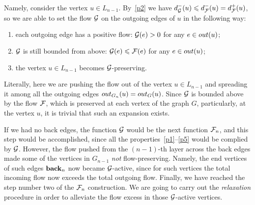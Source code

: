 \documentclass[12pt,oneside,a4paper]{amsart}
\begin{document}
        Namely, consider the vertex $u \in L_{n-1}$.
        By~\ref{p2} we have $d_{\cal{G}}^{-}(u) \leq d_{\flowpos}^{-}(u) = d_{\flowpos}^{+}(u)$,
          so we are able to set the flow $\cal{G}$ on the outgoing edges of $u$ in the following way:
        \begin{enumerate}[label=\textbf{(\roman*)}]
          \item\label{posprop} each outgoing edge has a positive flow: $\cal{G}(e) > 0$ for any $e \in \eout(u)$;
          \item $\cal{G}$ is still bounded from above: $\cal{G}(e) \leq \flowpos(e)$ for any $e \in \eout(u)$;
          \item the vertex $u \in L_{n-1}$ becomes $\cal{G}$-preserving.
        \end{enumerate}
        \begin{remark}
          Literally, here we are pushing the flow out of the vertex $u \in L_{n-1}$ and spreading it among all the outgoing edges
            $\eout_{G_n}(u) = \eout_G(u)$.
          Since $\cal{G}$ is bounded above by the flow $\flowpos$, which is preserved at each vertex of the graph $G$,
            particularly, at the vertex $u$, it is trivial that such an expansion exists.
        \end{remark}
        If we had no back edges, the function $\cal{G}$ would be the next function $\flowposn{n}$, and this step would be accomplished,
          since all the properties~\ref{p1}--\ref{p5} would be complied by $\cal{G}$.
        However, the flow pushed from the $(n-1)$-th layer across the back edges made some of the vertices in $G_{n-1}$ \emph{not} flow-preserving.
        Namely, the end vertices of such edges $\eback_{n}$ now became $\cal{G}$-active, since for such vertices
          the total incoming flow now exceeds the total outgoing flow.
        Finally, we have reached the step number two of the $\flowposn{n}$ construction.
        We are going to carry out the \emph{relaxation} procedure in order to alleviate the flow excess in those $\cal{G}$-active vertices.
\end{document}
